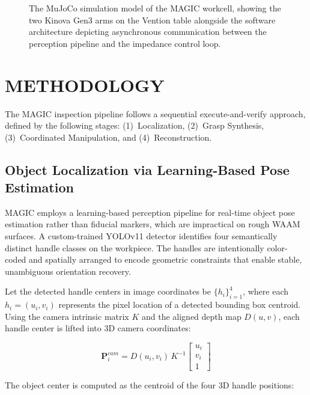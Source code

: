 \documentclass[letterpaper, 10 pt, conference]{ieeeconf}  %
\begin{document}
\begin{figure}[thpb]
   \centering
   \framebox{\parbox{3in}{}}
   \caption{The MuJoCo simulation model of the MAGIC workcell, showing the
   two Kinova Gen3 arms on the Vention table alongside the software
   architecture depicting asynchronous communication between the perception
   pipeline and the impedance control loop.}
   \label{fig:architecture}
\end{figure}


\section{METHODOLOGY}
\label{sec:methodology}

The MAGIC inspection pipeline follows a sequential execute-and-verify
approach, defined by the following stages: (1)~Localization, (2)~Grasp
Synthesis, (3)~Coordinated Manipulation, and (4)~Reconstruction.

\subsection{Object Localization via Learning-Based Pose Estimation}

MAGIC employs a learning-based perception pipeline for real-time object pose
estimation rather than fiducial markers, which are impractical on rough WAAM
surfaces. A custom-trained YOLOv11 detector identifies four semantically
distinct handle classes on the workpiece. The handles are intentionally
color-coded and spatially arranged to encode geometric constraints that enable
stable, unambiguous orientation recovery.

Let the detected handle centers in image coordinates be $\{h_i\}_{i=1}^{4}$,
where each $h_i = (u_i, v_i)$ represents the pixel location of a detected
bounding box centroid. Using the camera intrinsic matrix $K$ and the aligned
depth map $D(u,v)$, each handle center is lifted into 3D camera coordinates:

\begin{equation}
    \bm{P}_i^{cam} = D(u_i, v_i) \, K^{-1}
    \begin{bmatrix} u_i \\ v_i \\ 1 \end{bmatrix}
\end{equation}

The object center is computed as the centroid of the four 3D handle positions:
\end{document}
